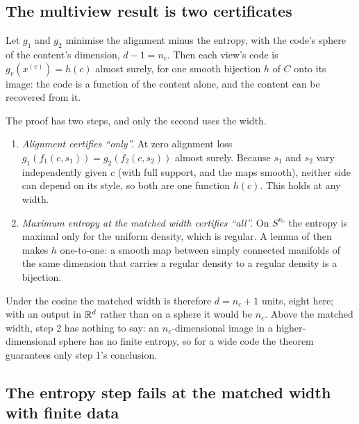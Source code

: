 \subsection{The multiview result is two certificates}
\label{sec:theory-result}

\begin{theorem}
\label{thm:block}
Let $g_1$ and $g_2$ minimise the alignment minus the entropy, with the code's
sphere of the content's dimension, $d - 1 = n_c$. Then each view's code is
$g_v(x^{(v)}) = h(c)$ almost surely, for one smooth bijection $h$ of $C$ onto its
image: the code is a function of the content alone, and the content can be
recovered from it.
\end{theorem}

The proof has two steps, and only the second uses the width.
\begin{enumerate}
\item \emph{Alignment certifies ``only''.} At zero alignment loss
  $g_1(f_1(c, s_1)) = g_2(f_2(c, s_2))$ almost surely. Because $s_1$ and $s_2$
  vary independently given $c$ (with full support, and the maps smooth), neither
  side can depend on its style, so both are one function $h(c)$. This holds at
  any width.
\item \emph{Maximum entropy at the matched width certifies ``all''.} On
  $S^{n_c}$ the entropy is maximal only for the uniform density, which is
  regular. A lemma of \citet{zimmermann2021contrastive} then makes $h$
  one-to-one: a smooth map between simply connected manifolds of the same
  dimension that carries a regular density to a regular density is a
  bijection. 
\end{enumerate}
Under the cosine the matched width is therefore $d = n_c + 1$ units, eight here;
with an output in $\mathbb{R}^{d}$ rather than on a sphere it would be $n_c$. Above the
matched width, step 2 has nothing to say: an $n_c$-dimensional image in a
higher-dimensional sphere has no finite entropy, so for a wide code the theorem
guarantees only step 1's conclusion.

\subsection{The entropy step fails at the matched width with finite data}
\label{sec:theory-gap}

